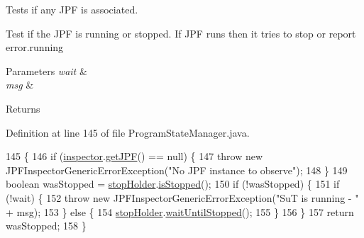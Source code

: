 Tests if any J\+PF is associated. 

Test if the J\+PF is running or stopped. If J\+PF runs then it tries to stop or report error.\+running


\begin{DoxyParams}{Parameters}
{\em wait} & \\
\hline
{\em msg} & \\
\hline
\end{DoxyParams}
\begin{DoxyReturn}{Returns}

\end{DoxyReturn}


Definition at line 145 of file Program\+State\+Manager.\+java.


\begin{DoxyCode}
145                                                                                                      \{
146     \textcolor{keywordflow}{if} (\hyperlink{classgov_1_1nasa_1_1jpf_1_1inspector_1_1server_1_1programstate_1_1_program_state_manager_a7f6b466bef8fa70a70390311e477f942}{inspector}.\hyperlink{classgov_1_1nasa_1_1jpf_1_1inspector_1_1server_1_1jpf_1_1_j_p_f_inspector_a477c3ffc6d31e17de09b335f801ad902}{getJPF}() == null) \{
147       \textcolor{keywordflow}{throw} \textcolor{keyword}{new} JPFInspectorGenericErrorException(\textcolor{stringliteral}{"No JPF instance to observe"});
148     \}
149     \textcolor{keywordtype}{boolean} wasStopped = \hyperlink{classgov_1_1nasa_1_1jpf_1_1inspector_1_1server_1_1programstate_1_1_program_state_manager_a81892c2dbe16ef208fdd688bc0ff7c8f}{stopHolder}.\hyperlink{classgov_1_1nasa_1_1jpf_1_1inspector_1_1server_1_1jpf_1_1_stop_holder_a9ce9430793863b6d314d8e44c8112081}{isStopped}();
150     \textcolor{keywordflow}{if} (!wasStopped) \{
151       \textcolor{keywordflow}{if} (!wait) \{
152         \textcolor{keywordflow}{throw} \textcolor{keyword}{new} JPFInspectorGenericErrorException(\textcolor{stringliteral}{"SuT is running - "} + msg);
153       \} \textcolor{keywordflow}{else} \{
154         \hyperlink{classgov_1_1nasa_1_1jpf_1_1inspector_1_1server_1_1programstate_1_1_program_state_manager_a81892c2dbe16ef208fdd688bc0ff7c8f}{stopHolder}.\hyperlink{classgov_1_1nasa_1_1jpf_1_1inspector_1_1server_1_1jpf_1_1_stop_holder_aa4e7899c51ecb3834e202f861af6e752}{waitUntilStopped}();
155       \}
156     \}
157     \textcolor{keywordflow}{return} wasStopped;
158   \}
\end{DoxyCode}
